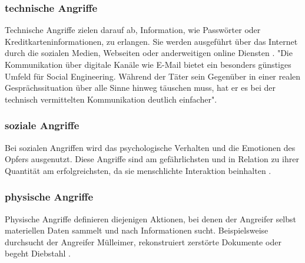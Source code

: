\subsubsection{technische Angriffe}

Technische Angriffe zielen darauf ab, Information, wie Passwörter oder Kreditkarteninformationen, zu erlangen. Sie werden ausgeführt über das Internet durch die sozialen Medien,
Webseiten oder anderweitigen online Diensten . "Die Kommunikation über digitale Kanäle wie E-Mail bietet ein besonders günstiges Umfeld für Social Engineering.
Während der Täter sein Gegenüber in einer realen Gesprächssituation über alle Sinne hinweg täuschen muss, hat er
es bei der technisch vermittelten Kommunikation deutlich einfacher".

\subsubsection{soziale Angriffe}

Bei sozialen Angriffen wird das psychologische Verhalten und die Emotionen des Opfers ausgenutzt. Diese Angriffe sind am gefährlichsten und in Relation zu ihrer Quantität am
erfolgreichsten, da sie menschlichte Interaktion beinhalten .

\subsubsection{physische Angriffe}

Physische Angriffe definieren diejenigen Aktionen, bei denen der Angreifer selbst materiellen Daten sammelt und nach Informationen sucht.
Beispielsweise durchsucht der Angreifer Mülleimer,
rekonstruiert zerstörte Dokumente oder begeht Diebstahl .






